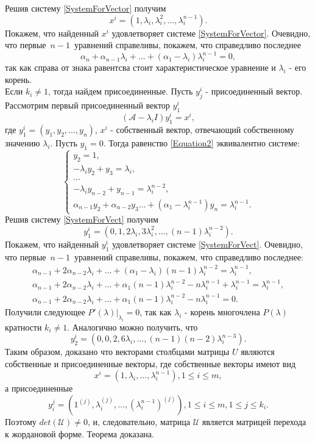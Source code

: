 Решив систему \eqref{SystemForVector} получим
$$
x^i = \left( 1, \lambda_i, \lambda_i ^2, \dots, \lambda_i ^{n-1} \right).
$$
Покажем, что найденный $x^i$ удовлетворяет системе \eqref{SystemForVector}. Очевидно, что первые~$n-1$~уравнений справеливы, покажем, что справедливо последнее
$$
\alpha_n + \alpha_{n-1} \lambda_i + \dots + (\alpha_1 - \lambda_i) \lambda_i ^{n-1} = 0,
$$
так как справа от знака равентсва стоит характеристическое уравнение и $\lambda_i$ - его корень.\\
Если $k_i \ne 1$, тогда найдем присоединенные.
Пусть $y^i_j$ - присоединенный вектор. Рассмотрим первый присоединенный вектор $y^i_1$
\begin{equation}\label{Equation2}
\left(\mathcal{A}-\lambda_i I \right) y^i_1 = x^i,
\end{equation}
где $y^i_1 =  \left( y_1, y_2, \dots, y_n \right)$, $x^i$ - собственный вектор, отвечающий собственному значению $\lambda_i$. Пусть $y_1 = 0$. Тогда равенство \eqref{Equation2} эквивалентно системе:
\begin{equation}\label{SystemForVect}
\begin{cases}
y_2 = 1, \\
-\lambda_i y_2 + y_3 = \lambda_i, \\
\dots \\
-\lambda_i y_{n-2} + y_{n-1} = \lambda_i ^{n-2}, \\
\alpha_{n-1} y_2 + \alpha_{n-2} y_3 \dots + (\alpha_1 - \lambda_i ^{n-1}) y_n = \lambda_i ^{n-1}.
\end{cases}
\end{equation}
Решив систему \eqref{SystemForVect} получим
$$
y^i_1 = \left(0, 1, 2 \lambda_i, 3 \lambda_i ^2, \dots, (n-1)\lambda_i ^{n-2} \right).
$$
Покажем, что найденный $y^i_1$ удовлетворяет системе \eqref{SystemForVect}. Очевидно, что первые~$n-1$~уравнений справеливы, покажем, что справедливо последнее:
\begin{align*}
\alpha_{n-1} + 2 \alpha_{n-2} \lambda_i + \dots + (\alpha_1 - \lambda_i) (n-1) \lambda_i ^{n-2} = \lambda_i ^{n-1}, \\
\alpha_{n-1} + 2 \alpha_{n-2} \lambda_i + \dots + \alpha_1 (n-1)\lambda_i ^{n-2} - n\lambda_i^{n-1} + \lambda_i ^{n-1} = \lambda_i ^{n-1}, \\
\alpha_{n-1} + 2 \alpha_{n-2} \lambda_i + \dots + \alpha_1 (n-1)\lambda_i ^{n-2} - n\lambda_i^{n-1} = 0.
\end{align*}
Получили следующее $\left.P'(\lambda)\right|_{\lambda_i} = 0$, так как $\lambda_i$ - корень многочлена $P(\lambda)$ кратности $k_i \ne 1$.
Аналогично можно получить, что 
$$
y^i_2 = \left(0, 0, 2, 6 \lambda_i, \dots, (n-1)(n-2)\lambda_i ^{n-3} \right).
$$
Таким образом, доказано что векторами столбцами матрицы $U$ являются собственные и присоединенные векторы, где собственные векторы имеют вид
$$x^i =(1, \lambda_i, \ldots, \lambda_i^{n-1}), 1 \leqslant i \leqslant m,$$
а присоединенные
$$
y_i^j = (1^{(j)}, \lambda_i^{(j)}, \ldots , (\lambda_i^{n-1})^{(j)}), 1 \leqslant i \leqslant m, 1 \leqslant j \leqslant k_i.
$$
Поэтому $det(\mathcal{U}) \ne 0$, и, следовательно, матрица $\mathcal{U}$ является матрицей перехода к жордановой форме. Теорема доказана.


